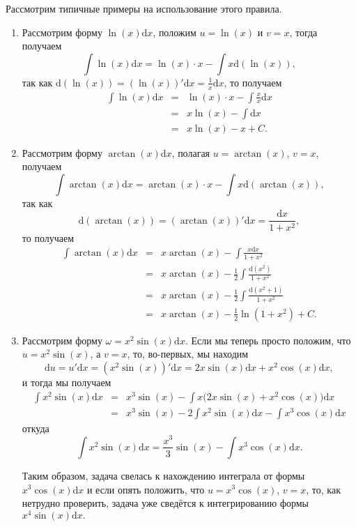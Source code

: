 \begin{example}
    Рассмотрим типичные примеры на использование этого правила.

    \begin{enumerate}
        \item Рассмотрим форму $\ln(x) \mathrm{d}x$, положим $u = \ln(x)$ и $v = x$, тогда получаем
\[ 
 \int \ln(x) \mathrm{d}x =  \ln(x)\cdot x - \int x \mathrm{d}(\ln (x)),
 \]
так как $\mathrm{d}(\ln(x)) = (\ln(x))'\mathrm{d}x = \frac{1}{x}\mathrm{d}x$, то получаем
\begin{eqnarray*}
 \int \ln(x) \mathrm{d}x &=& \ln(x) \cdot x - \int \frac{x}{x}\mathrm{d}x \\
 &=& x \ln(x) - \int \mathrm{d}x \\
 &=& x\ln(x) - x + C.   
\end{eqnarray*}
\item Рассмотрим форму $\arctan(x) \mathrm{d}x$, полагая $u = \arctan(x)$, $v = x$, получаем
\[
 \int \arctan(x) \mathrm{d}x = \arctan(x) \cdot x  - \int x \mathrm{d}(\arctan(x)),
\]
так как 
\[
 \mathrm{d}(\arctan(x)) = (\arctan(x))'\mathrm{d}x = \frac{\mathrm{d}x}{1+ x^2},
\]
то получаем
\begin{eqnarray*}
    \int \arctan(x) \mathrm{d}x &=& x \arctan(x) - \int \frac{x\mathrm{d}x}{1+x^2} \\
    &=& x \arctan(x) - \frac{1}{2} \int \frac{\mathrm{d}(x^2)}{1+x^2} \\
    &=& x \arctan(x) - \frac{1}{2} \int \frac{\mathrm{d}(x^2+1)}{1+x^2}\\
    &=& x \arctan(x) - \frac{1}{2} \ln(1+x^2) + C.
\end{eqnarray*}
 \item Рассмотрим форму $\omega = x^2 \sin(x) \mathrm{d}x$. Если мы теперь просто положим, что $u = x^2 \sin(x)$, а $v = x$, то, во-первых, мы находим
 \[
  \mathrm{d}u = u'\mathrm{d}x = (x^2 \sin(x))'\mathrm{d}x = 2x \sin(x) \mathrm{d}x + x^2 \cos(x) \mathrm{d}x,
 \]
и тогда мы получаем
\begin{eqnarray*}
  \int x^2 \sin(x) \mathrm{d}x &=& x^3 \sin(x) - \int x \bigl( 2x \sin(x) +x^2 \cos(x)  \bigr)\mathrm{d}x    \\
  &=& x^3 \sin(x) - 2 \int x^2 \sin(x) \mathrm{d}x - \int x^3 \cos(x)  \mathrm{d}x
\end{eqnarray*}
откуда
\[
 \int x^2 \sin(x) \mathrm{d}x = \frac{x^3}{3}\sin(x) -  \int x^3 \cos(x)  \mathrm{d}x.
\]

Таким образом, задача свелась к нахождению интеграла от формы $x^3 \cos(x)\mathrm{d}x$ и если опять положить, что $u= x^3 \cos(x)$, $v = x$, то, как нетрудно проверить, задача уже сведётся к интегрированию формы $x^4 \sin(x)\mathrm{d}x.$


\end{enumerate}
\end{example}
